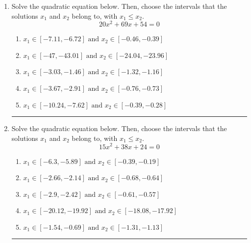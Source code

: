 \documentclass[14pt]{extbook}
\newcommand{\litem}[1]{\item#1\hspace*{-1cm}\rule{\textwidth}{0.4pt}}
\begin{document}
\begin{enumerate}
{\begin{enumerate}[label=\Alph*.]
\end{enumerate} }
\litem{
Solve the quadratic equation below. Then, choose the intervals that the solutions $x_1$ and $x_2$ belong to, with $x_1 \leq x_2$.\[ 20x^{2} +69 x + 54 = 0 \]\begin{enumerate}[label=\Alph*.]
\item \( x_1 \in [-7.11, -6.72] \text{ and } x_2 \in [-0.46, -0.39] \)
\item \( x_1 \in [-47, -43.01] \text{ and } x_2 \in [-24.04, -23.96] \)
\item \( x_1 \in [-3.03, -1.46] \text{ and } x_2 \in [-1.32, -1.16] \)
\item \( x_1 \in [-3.67, -2.91] \text{ and } x_2 \in [-0.76, -0.73] \)
\item \( x_1 \in [-10.24, -7.62] \text{ and } x_2 \in [-0.39, -0.28] \)

\end{enumerate} }
\litem{
Solve the quadratic equation below. Then, choose the intervals that the solutions $x_1$ and $x_2$ belong to, with $x_1 \leq x_2$.\[ 15x^{2} +38 x + 24 = 0 \]\begin{enumerate}[label=\Alph*.]
\item \( x_1 \in [-6.3, -5.89] \text{ and } x_2 \in [-0.39, -0.19] \)
\item \( x_1 \in [-2.66, -2.14] \text{ and } x_2 \in [-0.68, -0.64] \)
\item \( x_1 \in [-2.9, -2.42] \text{ and } x_2 \in [-0.61, -0.57] \)
\item \( x_1 \in [-20.12, -19.92] \text{ and } x_2 \in [-18.08, -17.92] \)
\item \( x_1 \in [-1.54, -0.69] \text{ and } x_2 \in [-1.31, -1.13] \)


\end{enumerate}}
\end{enumerate}
\end{document}
